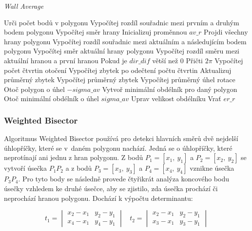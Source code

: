 \documentclass{article}
\begin{document}
\begin{spacing}{1.5}
\begin{algorithm}[h]
    \caption {\textit{Wall Average}}
    \begin{algorithmic}[1]
        \State Urči počet bodů v polygonu
        \State Vypočítej rozdíl souřadnic mezi prvním a druhým bodem polygonu
        \State Vypočítej směr hrany
        \State Inicializuj proměnnou $av\_r$ 
        \State Projdi všechny hrany polygonu
        \State \indent Vypočítej rozdíl souřadnic mezi aktuálním a následujícím bodem polygonu
        \State \indent Vypočítej směr aktuální hrany polygonu
        \State \indent Vypočítej rozdíl směru mezi aktuální hranou a první hranou
        \State \indent Pokud je $dir\_dif$ větší než 0
        \State \indent \indent Přičti $2\pi$
        \State \indent Vypočítej počet čtvrtin otočení
        \State \indent Vypočítej zbytek po odečtení počtu čtvrtin
        \State \indent Aktualizuj průměrný zbytek 
        \State Vypočítej průměrný zbytek
        \State Vypočítej průměrný úhel rotace
        \State Otoč polygon o úhel $-sigma\_av$
        \State Vytvoř minimální obdélník pro daný polygon
        \State  Otoč minimální obdélník o úhel $sigma\_av$
        \State Uprav velikost obdélníku 
        \State Vrať $er\_r$
    \end{algorithmic}
\end{algorithm}


\subsubsection{Weighted Bisector}
Algoritmus Weighted Bisector používá pro detekci hlavních směrů dvě nejdelší úhlopříčky, které se v~daném polygonu nachází. Jedná se o úhlopříčky, které neprotínají ani jednu z hran polygonu. Z bodů $P_1 = [x_1,\ y_1]$ a $P_2 = [x_2,\ y_2]$ se vytvoří úsečka $P_1P_2$ a z bodů $P_3 = [x_3,\ y_3]$ a $P_4 = [x_4,\ y_4]$ vznikne úsečka $P_3P_4$. Pro tyto body se následně provede čtyřikrát analýza koncového bodu úsečky vzhledem ke druhé úsečce, aby se zjistilo, zda úsečka prochází či neprochází hranou polygonu. Dochází k výpočtu determinantu: 

$$t_1 = \begin{vmatrix} x_2 - x_1 & y_2 - y_1 \\ x_4 - x_1 & y_4 - y_1  \end{vmatrix} \ \ \ \
t_2 = \begin{vmatrix} x_2 - x_1 & y_2 - y_1 \\ x_3 - x_1 & y_3 - y_1  \end{vmatrix}$$


\end{spacing}
\end{document}
